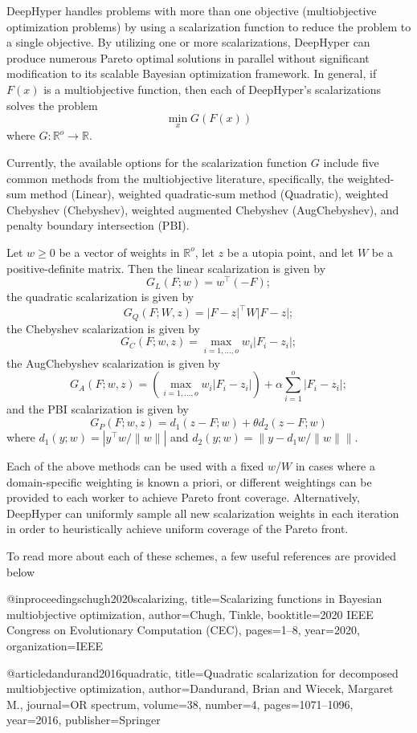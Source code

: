 DeepHyper handles problems with more than one objective (multiobjective
optimization problems) by using a scalarization function to reduce the
problem to a single objective. By utilizing one or more scalarizations,
DeepHyper can produce numerous Pareto optimal solutions in parallel without
significant modification to its scalable Bayesian optimization framework.
In general, if $F(x)$ is a multiobjective function, then each of DeepHyper's
scalarizations solves the problem
$$
\min_x G(F(x))
$$
where $G : \mathbb{R}^o \rightarrow \mathbb{R}$.

Currently, the available options for the scalarization function $G$ include
five common methods from the multiobjective literature, specifically,
the weighted-sum method (Linear), weighted quadratic-sum method (Quadratic),
weighted Chebyshev (Chebyshev), weighted augmented Chebyshev (AugChebyshev),
and penalty boundary intersection (PBI).

Let $w \geq 0$ be a vector of weights in $\mathbb{R}^o$, let $z$ be a utopia
point, and let $W$ be a positive-definite matrix. Then the linear
scalarization is given by
$$
G_{L}(F; w) = w^\top (-F);
$$
the quadratic scalarization is given by
$$
G_{Q}(F; W, z) = |F - z|^\top W |F - z|;
$$
the Chebyshev scalarization is given by
$$
G_{C}(F; w, z) = \max_{i=1,\ldots,o} w_i|F_i - z_i|;
$$
the AugChebyshev scalarization is given by
$$
G_{A}(F; w, z) = (\max_{i=1,\ldots,o} w_i|F_i - z_i|)
                 + \alpha\sum_{i=1}^o|F_i - z_i|;
$$
and the PBI scalarization is given by
$$
G_{P}(F; w, z) = d_1(z - F; w) + \theta d_2(z - F; w)
$$
where $d_1(y; w) = |y^\top w / \|w\||$ and
$d_2(y; w) = \|y - d_1 w / \|w\|\|$.

Each of the above methods can be used with a fixed $w$/$W$ in cases where a
domain-specific weighting is known a priori, or different weightings can be
provided to each worker to achieve Pareto front coverage. Alternatively,
DeepHyper can uniformly sample all new scalarization weights in each iteration
in order to heuristically achieve uniform coverage of the Pareto front.

To read more about each of these schemes, a few useful references are provided
below

@inproceedings{chugh2020scalarizing,
  title={Scalarizing functions in Bayesian multiobjective optimization},
  author={Chugh, Tinkle},
  booktitle={2020 IEEE Congress on Evolutionary Computation (CEC)},
  pages={1--8},
  year={2020},
  organization={IEEE}
}

@article{dandurand2016quadratic,
  title={Quadratic scalarization for decomposed multiobjective optimization},
  author={Dandurand, Brian and Wiecek, Margaret M.},
  journal={OR spectrum},
  volume={38},
  number={4},
  pages={1071--1096},
  year={2016},
  publisher={Springer}
}

